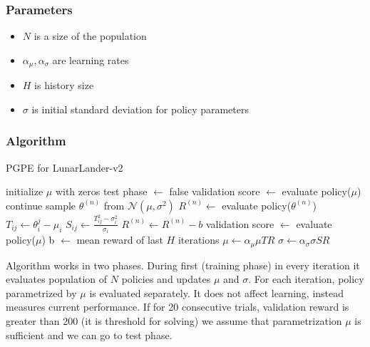 \documentclass[12pt]{article}
\begin{document}
\subsubsection{Parameters}

\begin{itemize}
\item $N$ is a size of the population
\item $\alpha_\mu, \alpha_\sigma$ are learning rates
\item $H$ is history size
\item $\sigma$ is initial standard deviation for policy parameters

\end{itemize}

\subsubsection{Algorithm}

\begin{algorithm}
\caption{PGPE for LunarLander-v2}
\begin{algorithmic}[1]
\State initialize $\mu$ with zeros
\State test phase $\gets$ false
		\State validation score $\gets$ evaluate policy($\mu$)
		\State continue
	\EndIf
		\State sample $\theta^{(n)}$ from $\mathcal{N}(\mu, \sigma^2)$
	\State $R^{(n)} \gets$ evaluate policy($\theta^{(n)}$)
	\EndFor
	\State $T_{ij} \gets \theta_i^{j} - \mu_i$
	\State $S_{ij} \gets \frac{T_{ij}^2 - \sigma_i^2}{\sigma_i}$
	\State $R^{(n)} \gets R^{(n)} - b$
	\State validation score $\gets$ evaluate policy($\mu$)
	\State b $\gets$ mean reward of last $H$ iterations
	\EndIf
	\State $\mu \gets \alpha_\mu \mu TR$
	\State $\sigma \gets \alpha_\sigma \sigma SR$
\EndWhile

\end{algorithmic}
\end{algorithm}

Algorithm works in two phases. During first (training phase) in every iteration it evaluates population of $N$ policies and updates $\mu$ and $\sigma$. For each iteration, policy parametrized by $\mu$ is evaluated separately. It does not affect learning, instead measures current performance. If for 20 consecutive trials, validation reward is greater than 200 (it is threshold for solving) we assume that parametrization $\mu$ is sufficient and we can go to test phase.
\end{document}
